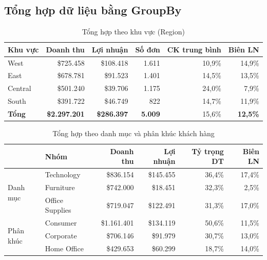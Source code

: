 \documentclass[12pt,a4paper]{article}
\newcommand{\usd}[1]{\$#1}
\begin{document}
\subsection{Tổng hợp dữ liệu bằng GroupBy}
\begin{table}[H]
\centering
\caption{Tổng hợp theo khu vực (Region)}\label{tab:region}
\begin{tabular}{@{}lrrrrr@{}}
\toprule
\textbf{Khu vực} & \textbf{Doanh thu} & \textbf{Lợi nhuận} & \textbf{Số đơn} & \textbf{CK trung bình} & \textbf{Biên LN} \\
\midrule
West    & \usd{725.458} & \usd{108.418} & 1.611 & 10,9\% & 14,9\% \\
East    & \usd{678.781} & \usd{91.523}  & 1.401 & 14,5\% & 13,5\% \\
Central & \usd{501.240} & \usd{39.706}  & 1.175 & 24,0\% & 7,9\% \\
South   & \usd{391.722} & \usd{46.749}  & 822   & 14,7\% & 11,9\% \\
\midrule
\textbf{Tổng} & \textbf{\usd{2.297.201}} & \textbf{\usd{286.397}} & \textbf{5.009} & 15,6\% & \textbf{12,5\%} \\
\bottomrule
\end{tabular}
\end{table}

\begin{table}[H]
\centering
\caption{Tổng hợp theo danh mục và phân khúc khách hàng}\label{tab:catseg}
\begin{tabular}{@{}llrrrr@{}}
\toprule
& \textbf{Nhóm} & \textbf{Doanh thu} & \textbf{Lợi nhuận} & \textbf{Tỷ trọng DT} & \textbf{Biên LN} \\
\midrule
\multirow{3}{*}{Danh mục}
 & Technology      & \usd{836.154} & \usd{145.455} & 36,4\% & 17,4\% \\
 & Furniture       & \usd{742.000} & \usd{18.451}  & 32,3\% & 2,5\% \\
 & Office Supplies & \usd{719.047} & \usd{122.491} & 31,3\% & 17,0\% \\
\midrule
\multirow{3}{*}{Phân khúc}
 & Consumer    & \usd{1.161.401} & \usd{134.119} & 50,6\% & 11,5\% \\
 & Corporate   & \usd{706.146}   & \usd{91.979}  & 30,7\% & 13,0\% \\
 & Home Office & \usd{429.653}   & \usd{60.299}  & 18,7\% & 14,0\% \\
\bottomrule
\end{tabular}
\end{table}
\end{document}
